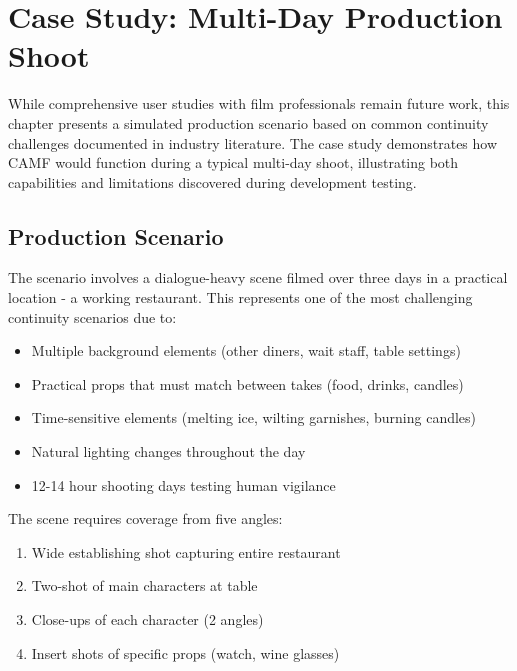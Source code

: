 \chapter{Case Study: Multi-Day Production Shoot}
\label{ch:casestudy}


While comprehensive user studies with film professionals remain future work, this chapter presents a simulated production scenario based on common continuity challenges documented in industry literature. The case study demonstrates how CAMF would function during a typical multi-day shoot, illustrating both capabilities and limitations discovered during development testing.

\section{Production Scenario}
\label{sec:case-setup}

The scenario involves a dialogue-heavy scene filmed over three days in a practical location - a working restaurant. This represents one of the most challenging continuity scenarios due to:

\begin{itemize}
\item Multiple background elements (other diners, wait staff, table settings)
\item Practical props that must match between takes (food, drinks, candles)
\item Time-sensitive elements (melting ice, wilting garnishes, burning candles)  
\item Natural lighting changes throughout the day
\item 12-14 hour shooting days testing human vigilance
\end{itemize}

The scene requires coverage from five angles:
\begin{enumerate}
\item Wide establishing shot capturing entire restaurant
\item Two-shot of main characters at table
\item Close-ups of each character (2 angles)
\item Insert shots of specific props (watch, wine glasses)
\end{enumerate}

